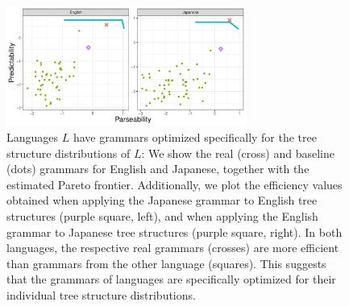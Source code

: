 \documentclass[10pt,twoside,lineno]{article}
\begin{document}
\begin{figure}
\centering
	\includegraphics[width=0.7\textwidth]{../results/plane/pareto-plane-other-language.pdf}
	\caption[]{Languages $L$ have grammars optimized specifically for the tree structure distributions of $L$: We show the real (cross) and baseline (dots) grammars for English and Japanese, together with the estimated Pareto frontier. Additionally, we plot the efficiency values obtained when applying the Japanese grammar to English tree structures (purple square, left), and when applying the English grammar to Japanese tree structures (purple square, right). In both languages, the respective real grammars (crosses) are more efficient than grammars from the other language (squares). This suggests that the grammars of languages are specifically optimized for their individual tree structure distributions.}\label{fig:english-japanese-crossed}
\end{figure}
\end{document}

